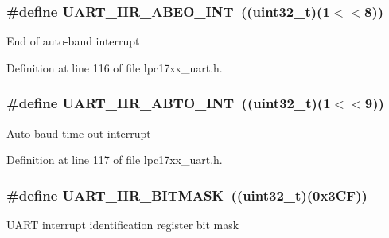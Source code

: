 \subsubsection[{\texorpdfstring{U\+A\+R\+T\+\_\+\+I\+I\+R\+\_\+\+A\+B\+E\+O\+\_\+\+I\+NT}{UART_IIR_ABEO_INT}}]{\setlength{\rightskip}{0pt plus 5cm}\#define U\+A\+R\+T\+\_\+\+I\+I\+R\+\_\+\+A\+B\+E\+O\+\_\+\+I\+NT~(({\bf uint32\+\_\+t})(1$<$$<$8))}\hypertarget{group___u_a_r_t___private___macros_ga6ce7f02b02e196d84ef8f6066dd2b9d4}{}\label{group___u_a_r_t___private___macros_ga6ce7f02b02e196d84ef8f6066dd2b9d4}
End of auto-\/baud interrupt 

Definition at line 116 of file lpc17xx\+\_\+uart.\+h.

\subsubsection[{\texorpdfstring{U\+A\+R\+T\+\_\+\+I\+I\+R\+\_\+\+A\+B\+T\+O\+\_\+\+I\+NT}{UART_IIR_ABTO_INT}}]{\setlength{\rightskip}{0pt plus 5cm}\#define U\+A\+R\+T\+\_\+\+I\+I\+R\+\_\+\+A\+B\+T\+O\+\_\+\+I\+NT~(({\bf uint32\+\_\+t})(1$<$$<$9))}\hypertarget{group___u_a_r_t___private___macros_ga29486c78b0afdb4b3943defe36d5404c}{}\label{group___u_a_r_t___private___macros_ga29486c78b0afdb4b3943defe36d5404c}
Auto-\/baud time-\/out interrupt 

Definition at line 117 of file lpc17xx\+\_\+uart.\+h.

\subsubsection[{\texorpdfstring{U\+A\+R\+T\+\_\+\+I\+I\+R\+\_\+\+B\+I\+T\+M\+A\+SK}{UART_IIR_BITMASK}}]{\setlength{\rightskip}{0pt plus 5cm}\#define U\+A\+R\+T\+\_\+\+I\+I\+R\+\_\+\+B\+I\+T\+M\+A\+SK~(({\bf uint32\+\_\+t})(0x3\+C\+F))}\hypertarget{group___u_a_r_t___private___macros_gad443b74131fa7b7aecf0f1c581172faa}{}\label{group___u_a_r_t___private___macros_gad443b74131fa7b7aecf0f1c581172faa}
U\+A\+RT interrupt identification register bit mask 

